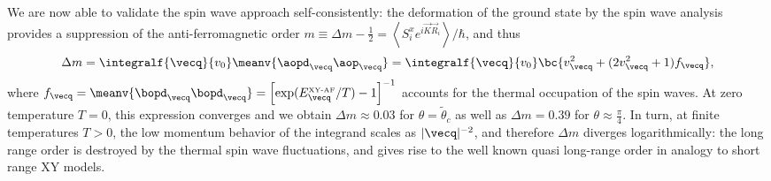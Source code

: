 We are now able to validate the spin wave approach self-consistently: the deformation of the ground state by the spin wave analysis
provides a suppression of the anti-ferromagnetic order $ m \equiv  \Delta m - \frac{1}{2}=\left\langle S^x_i e^{i {\vec K} {\vec R_i}} \right\rangle / \hbar$,
and thus
%
\begin{align}
    \Delta m= \integralf{\vecq}{v_0} \meanv{ \aopd_{\vecq} \aop_{\vecq} } = \integralf{\vecq}{v_0}  \bc{ v_{\vecq}^2 + (2 v_{\vecq}^2 + 1) f_{\vecq} },
\end{align}
%
where $f_{\vecq} = \meanv{ \bopd_\vecq \bopd_\vecq } = \left[\exp(E^{\mbox{\tiny XY-AF}}_{\vecq}/ T)-1\right]^{-1}$ accounts for the thermal occupation of the spin waves. At zero temperature $T=0$, this expression converges and  we obtain $\Delta m \approx 0.03$ for $\theta = \tilde\theta_c$ as well as $\Delta m = 0.39$ for $\theta \approx \frac{\pi}{4}$. In turn, at finite temperatures $T>0$, the low momentum behavior of  the integrand scales as $|{\vecq}|^{-2}$, and therefore $\Delta m$ diverges logarithmically: the long range order is destroyed by the thermal spin wave fluctuations, and gives rise to the well known
quasi long-range order in analogy to short range XY models.

